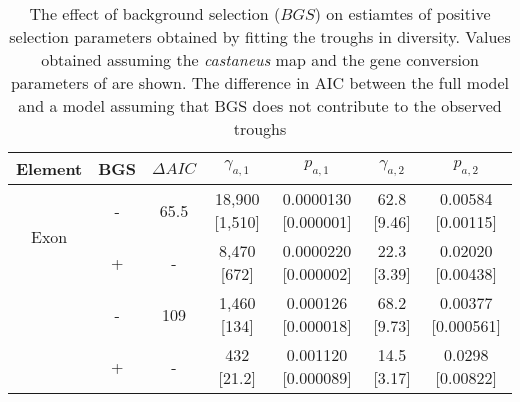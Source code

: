 
\begin{table}
   \centering
   \begin{threeparttable}[b]
\caption{The effect of background selection ($BGS$) on estiamtes of positive selection parameters obtained by fitting the troughs in diversity. Values obtained assuming the \textit{castaneus} map and the gene conversion parameters of \cite{RN263} are shown. The difference in AIC between the full model and a model assuming that BGS does not contribute to the observed troughs }


\begin{tabular}{ccccccc}
\toprule
       Element & BGS & $\Delta AIC$ &  $\gamma_{a,1}$ &      $p_{a,1}$ &       $\gamma_{a,2}$ &      $p_{a,2}$  \\
\midrule
\multirow{2}{*}{Exon}    & - &  65.5 & 18,900 [1,510]   &  0.0000130 [0.000001] &  62.8 [9.46] &  0.00584 [0.00115] \\
 					    & + & -    &  8,470  [672]   &  0.0000220 [0.000002] &  22.3 [3.39] &  0.02020   [0.00438] \\ \hdashline
 \multirow{2}{*}{CNE}   & - &   109 &   1,460 [134]   &  0.000126 [0.000018] &  68.2  [9.73] &  0.00377 [0.000561] \\
                        & + & -    &    432  [21.2] &  0.001120 [0.000089] &  14.5 [3.17] &  0.0298   [0.00822] \\
\bottomrule
\end{tabular}

\end{threeparttable}
  \label{tab:BGSeffect}

\end{table}